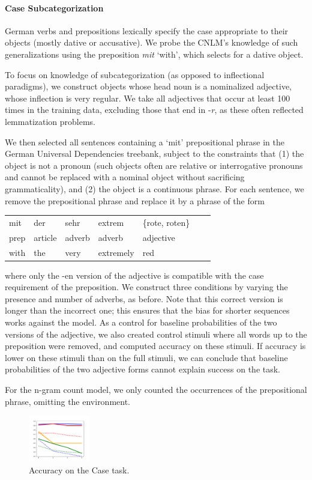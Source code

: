 \paragraph{Case Subcategorization}
German verbs and prepositions lexically specify the case appropriate to their objects (mostly dative or accusative).
We probe the CNLM's knowledge of such generalizations using the preposition \textit{mit} `with', which selects for a dative object.

To focus on knowledge of subcategorization (as opposed to inflectional paradigms), we construct objects whose head noun is a nominalized adjective, whose inflection is very regular.
We take all adjectives that occur at least 100 times in the training data, excluding those that end in -\emph{r}, as these often reflected lemmatization problems.

We then selected all sentences containing a `mit' prepositional phrase in the German Universal Dependencies treebank, subject to the constraints that (1) the object is not a pronoun (such objects often are relative or interrogative pronouns and cannot be replaced with a nominal object without sacrificing grammaticality), and (2) the object is a continuous phrase.
For each sentence, we remove the prepositional phrase and replace it by a phrase of the form
\begin{tabular}{lllllll}
	mit & der & sehr& extrem& \{rote, roten\} \\
	prep & article & adverb & adverb & adjective \\
	with & the & very & extremely & red 
\end{tabular}
where only the -en version of the adjective is compatible with the case requirement of the preposition.
We construct three conditions by varying the presence and number of adverbs, as before.
Note that this correct version is longer than the incorrect one; this ensures that the bias for shorter sequences works against the model.
As a control for baseline probabilities of the two versions of the adjective, we also created control stimuli where all words up to the preposition were removed, and computed accuracy on these stimuli.
If accuracy is lower on these stimuli than on the full stimuli, we can conclude that baseline probabilities of the two adjective forms cannot explain success on the task.

For the n-gram count model, we only counted the occurrences of the prepositional phrase, omitting the environment.

\begin{figure}
\includegraphics[width=0.24\textwidth]{figures/german-prep-with-control.pdf}
\caption{Accuracy on the Case task.}\label{fig:prep}
\end{figure}

